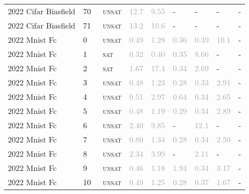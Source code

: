 \begin{center}
{\begin{longtable}{@{}lllllllll@{}}
2022 Cifar Biasfield & 70 & ~\textsc{unsat} & \textcolor{darkgray}{12.7} & \textcolor{darkgray}{9.55} & - & - & - & - \\
2022 Cifar Biasfield & 71 & ~\textsc{unsat} & \textcolor{darkgray}{13.2} & \textcolor{darkgray}{10.6} & - & - & - & - \\
\midrule
2022 Mnist Fc & 0 & ~\textsc{unsat} & \textcolor{darkgray}{0.49} & \textcolor{darkgray}{1.28} & \textcolor{darkgray}{0.36} & \textcolor{darkgray}{0.39} & \textcolor{darkgray}{10.1} & - \\
2022 Mnist Fc & 1 & ~\textsc{sat} & \textcolor{darkgray}{0.32} & \textcolor{darkgray}{0.40} & \textcolor{darkgray}{0.35} & \textcolor{darkgray}{8.66} & - & - \\
2022 Mnist Fc & 2 & ~\textsc{sat} & \textcolor{darkgray}{1.67} & \textcolor{darkgray}{17.4} & \textcolor{darkgray}{0.34} & \textcolor{darkgray}{2.69} & - & - \\
2022 Mnist Fc & 3 & ~\textsc{unsat} & \textcolor{darkgray}{0.48} & \textcolor{darkgray}{1.23} & \textcolor{darkgray}{0.28} & \textcolor{darkgray}{0.33} & \textcolor{darkgray}{2.91} & - \\
2022 Mnist Fc & 4 & ~\textsc{unsat} & \textcolor{darkgray}{0.51} & \textcolor{darkgray}{2.97} & \textcolor{darkgray}{0.64} & \textcolor{darkgray}{0.34} & \textcolor{darkgray}{2.65} & - \\
2022 Mnist Fc & 5 & ~\textsc{unsat} & \textcolor{darkgray}{0.48} & \textcolor{darkgray}{1.19} & \textcolor{darkgray}{0.29} & \textcolor{darkgray}{0.34} & \textcolor{darkgray}{2.89} & - \\
2022 Mnist Fc & 6 & ~\textsc{unsat} & \textcolor{darkgray}{2.40} & \textcolor{darkgray}{9.85} & - & \textcolor{darkgray}{12.1} & - & - \\
2022 Mnist Fc & 7 & ~\textsc{unsat} & \textcolor{darkgray}{0.80} & \textcolor{darkgray}{1.34} & \textcolor{darkgray}{0.28} & \textcolor{darkgray}{0.34} & \textcolor{darkgray}{2.50} & - \\
2022 Mnist Fc & 8 & ~\textsc{unsat} & \textcolor{darkgray}{2.34} & \textcolor{darkgray}{3.99} & - & \textcolor{darkgray}{2.11} & - & - \\
2022 Mnist Fc & 9 & ~\textsc{unsat} & \textcolor{darkgray}{0.46} & \textcolor{darkgray}{1.18} & \textcolor{darkgray}{1.94} & \textcolor{darkgray}{0.34} & \textcolor{darkgray}{3.17} & - \\
2022 Mnist Fc & 10 & ~\textsc{unsat} & \textcolor{darkgray}{0.49} & \textcolor{darkgray}{1.25} & \textcolor{darkgray}{0.28} & \textcolor{darkgray}{0.37} & \textcolor{darkgray}{1.67} & - \\

\end{longtable}}
\end{center}
